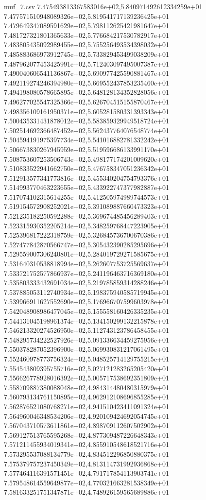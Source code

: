 \begin{filecontents*}{muf_7.csv}
7.475493813367583016e+02,5.840971492612334259e+01
7.477571510948089326e+02,5.819541717139236425e+01
7.479649347089591629e+02,5.798112625421981647e+01
7.481727321801365633e+02,5.776684217530782917e+01
7.483805435092989455e+02,5.755256493534398032e+01
7.485883686973912745e+02,5.733829453499038209e+01
7.487962077453425991e+02,5.712403097495007387e+01
7.490040606541136867e+02,5.690977425590881467e+01
7.492119274246394980e+02,5.669552437853235460e+01
7.494198080578665895e+02,5.648128134352828056e+01
7.496277025547325366e+02,5.626704515155870467e+01
7.498356109161950371e+02,5.605281580331393343e+01
7.500435331431878012e+02,5.583859329949518724e+01
7.502514692366487452e+02,5.562437764076548774e+01
7.504594191975397734e+02,5.541016882781332242e+01
7.506673830267945959e+02,5.519596686133991170e+01
7.508753607253506743e+02,5.498177174201009620e+01
7.510833522941662750e+02,5.476758347051236342e+01
7.512913577341773816e+02,5.455340204754793376e+01
7.514993770463223655e+02,5.433922747377982887e+01
7.517074102315614255e+02,5.412505974989744573e+01
7.519154572908252021e+02,5.391089887660473323e+01
7.521235182250592288e+02,5.369674485456289403e+01
7.523315930352205214e+02,5.348259768447223905e+01
7.525396817222318759e+02,5.326845736700670386e+01
7.527477842870566747e+02,5.305432390285295696e+01
7.529559007306240801e+02,5.284019729271585675e+01
7.531640310538818994e+02,5.262607753725569637e+01
7.533721752577866937e+02,5.241196463716369180e+01
7.535803333432691034e+02,5.219785859314288246e+01
7.537885053112740934e+02,5.198375940585719945e+01
7.539966911627552690e+02,5.176966707599603978e+01
7.542048908986477045e+02,5.155558160426335235e+01
7.544131045198961374e+02,5.134150299132215878e+01
7.546213320274526950e+02,5.112743123786458455e+01
7.548295734222527926e+02,5.091336634459275956e+01
7.550378287052396900e+02,5.069930831217061495e+01
7.552460978773756324e+02,5.048525714129755215e+01
7.554543809395755716e+02,5.027121283265205420e+01
7.556626778928016392e+02,5.005717538692351809e+01
7.558709887380088048e+02,4.984314480480315979e+01
7.560793134761150895e+02,4.962912108696855285e+01
7.562876521080768271e+02,4.941510423411091324e+01
7.564960046348534206e+02,4.920109424692054745e+01
7.567043710573611861e+02,4.898709112607502902e+01
7.569127513765595268e+02,4.877309487226648343e+01
7.571211455934019341e+02,4.855910548618521716e+01
7.573295537088134779e+02,4.834512296850880375e+01
7.575379757237450349e+02,4.813114731992936868e+01
7.577464116391571451e+02,4.791717854113903741e+01
7.579548614559649877e+02,4.770321663281538349e+01
7.581633251751347871e+02,4.748926159565689886e+01

\end{filecontents*}
